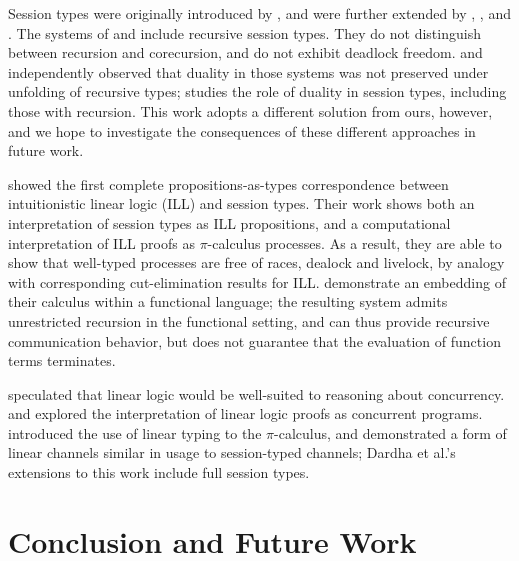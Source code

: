 \documentclass[orivec,envcountsame]{llncs}
\begin{document}
Session types were originally introduced by \citet{Honda93}, and were further extended by
\citet{Takeuchi94}, \citet{Honda98}, and \citet{Yoshida07}. The systems of \citet{Honda98} and
\citet{Yoshida07} include recursive session types. They do not distinguish between recursion and
corecursion, and do not exhibit deadlock freedom. \citet{Bono12} and \citet{Bernardi13}
independently observed that duality in those systems was not preserved under unfolding of recursive
types; \citet{Bernardi14} studies the role of duality in session types, including those with
recursion.  This work adopts a different solution from ours, however, and we hope to investigate the
consequences of these different approaches in future work.

\citet{CairesPfenning10} showed the first complete propositions-as-types correspondence between
intuitionistic linear logic (ILL) and session types. Their work shows both an interpretation of
session types as ILL propositions, and a computational interpretation of ILL proofs as
$\pi$-calculus processes. As a result, they are able to show that well-typed processes are free of
races, dealock and livelock, by analogy with corresponding cut-elimination results for
ILL. \citet{Toninho13} demonstrate an embedding of their calculus within a functional language; the
resulting system admits unrestricted recursion in the functional setting, and can thus provide
recursive communication behavior, but does not guarantee that the evaluation of function terms
terminates.

\citet{Girard87} speculated that linear logic would be well-suited to reasoning about concurrency.
\citet{Abramsky92} and \citet{BellinScott94} explored the interpretation of linear logic proofs as
concurrent programs. \citet{Kobayashi96} introduced the use of linear typing to the $\pi$-calculus,
and demonstrated a form of linear channels similar in usage to session-typed channels; Dardha et
al.'s~\citeyearpar{Dardha12} extensions to this work include full session types.

\section{Conclusion and Future Work}\label{sec:future}
\end{document}
